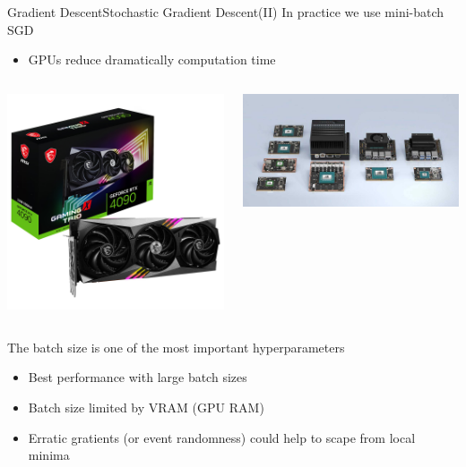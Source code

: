 \documentclass[10pt,compress]{beamer} %
\begin{document}
\begin{frame}{Gradient Descent}{Stochastic Gradient Descent(II)}
    In practice we use mini-batch SGD
    \begin{itemize}
	 \item GPUs reduce dramatically computation time
    \end{itemize}

    \begin{columns}
	\includegraphics[width=\linewidth]{figs/4090.jpg}

	\includegraphics[width=\linewidth]{figs/jetson.jpg}
   \end{columns}

    The batch size is one of the most important hyperparameters 
    \begin{itemize}
	\item Best performance with large batch sizes
    \item Batch size limited by VRAM (GPU RAM)
	\item Erratic gratients (or event randomness) could help to scape from local minima
    \end{itemize}
\end{frame}
\end{document}
